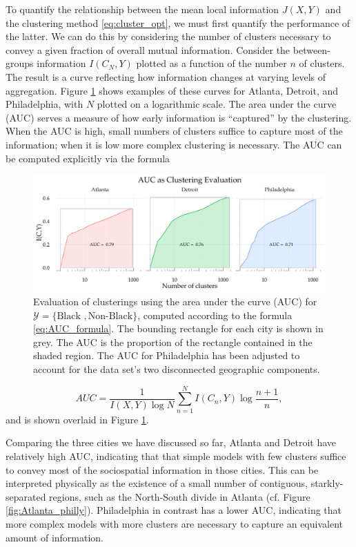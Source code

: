 \documentclass[english]{scrartcl}
\begin{document}
		To quantify the relationship between the mean local information $J(X,Y)$ and the clustering method \eqref{eq:cluster_opt}, we must first quantify the performance of the latter. We can do this by considering the number of clusters necessary to convey a given fraction of overall mutual information. Consider the between-groups information $I(C_N,Y)$ plotted as a function of the number $n$ of clusters. The result is a curve reflecting how information changes at varying levels of aggregation. Figure \ref{fig:AUC} shows examples of these curves for Atlanta, Detroit, and Philadelphia, with $N$ plotted on a logarithmic scale. The area under the curve (AUC) serves a measure of how early information is ``captured'' by the clustering. When the AUC is high, small numbers of clusters suffice to capture most of the information; when it is low more complex clustering is necessary. The AUC can be computed explicitly via the formula
		\begin{figure}
			\includegraphics[width=\textwidth]{figs/AUC_illustration.pdf}
			\caption{Evaluation of clusterings using the area under the curve (AUC) for $\mathcal{Y} = \{\text{Black }, \text{Non-Black}\}$, computed according to the formula \eqref{eq:AUC_formula}. The bounding rectangle for each city is shown in grey. The AUC is the proportion of the rectangle contained in the shaded region. The AUC for Philadelphia has been adjusted to account for the data set's two disconnected geographic components.} \label{fig:AUC}
		\end{figure}
		\begin{equation}
			AUC = \frac{1}{I(X,Y) \log N} \sum_{n=1}^N I(C_n, Y) \log \frac{n+1}{n}, \label{eq:AUC_formula}
		\end{equation}
		and is shown overlaid in Figure \ref{fig:AUC}. 

		Comparing the three cities we have discussed so far, Atlanta and Detroit have relatively high AUC, indicating that that simple models with few clusters suffice to convey most of the sociospatial information in those cities. This can be interpreted physically as the existence of a small number of contiguous, starkly-separated regions, such as the North-South divide in Atlanta (cf. Figure \ref{fig:Atlanta_philly}). Philadelphia in contrast has a lower AUC, indicating that more complex models with more clusters are necessary to capture an equivalent amount of information. 
\end{document}
